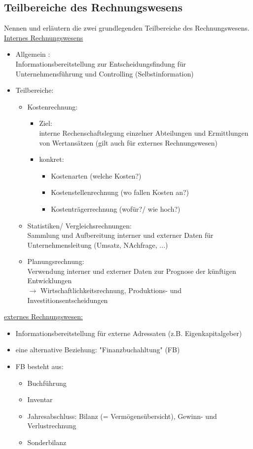 \documentclass[paper=a4, fontsize=11pt]{scrartcl}
\numberwithin{equation}{section}
\numberwithin{figure}{section}
\numberwithin{table}{section}
\begin{document}
\subsection{Teilbereiche des Rechnungswesens}

Nennen und erläutern die zwei grundlegenden Teilbereiche des Rechnungswesens. \\

\underline{Internes Rechnungswesens}
\begin{itemize}
  \item Allgemein :\\
  Informationsbereitstellung zur Entscheidungsfindung für Unternehmensführung und
  Controlling (Selbstinformation)
  \item Teilbereiche:
  \begin{itemize}
    \item Kostenrechnung:
    \begin{itemize}
      \item Ziel: \\
      interne Rechenschaftslegung einzelner Abteilungen und Ermittlungen von Wertansätzen
      (gilt auch für externes Rechnungswesen)
      \item konkret:
      \begin{itemize}
        \item Kostenarten (welche Kosten?)
        \item Kostenstellenrechnung (wo fallen Kosten an?)
        \item Kostenträgerrechnung (wofür?/ wie hoch?)
      \end{itemize}
    \end{itemize}
    \item Statistiken/ Vergleichsrechnungen: \\
    Sammlung und Aufbereitung interner und externer Daten für
    Unternehmensleitung (Umsatz, NAchfrage, ...)
    \item Planungsrechnung: \\
    Verwendung interner und externer Daten zur Prognose der künftigen Entwicklungen \\
    $\rightarrow$ Wirtschaftlichkeitsrechnung, Produktions- und Investitionsentscheidungen
  \end{itemize}
\end{itemize}

\underline{externes Rechnungswesen:}

\begin{itemize}
  \item Informationsbereitstellung für externe Adressaten (z.B. Eigenkapitalgeber)
  \item eine alternative Beziehung: "Finanzbuchahltung" (FB)
  \item FB besteht aus:
  \begin{itemize}
    \item Buchführung
    \item Inventar
    \item Jahresabschluss: Bilanz (= Vermögensübersicht), Gewinn- und Verlustrechnung
    \item Sonderbilanz
  \end{itemize}
\end{itemize}
\end{document}
